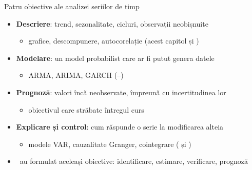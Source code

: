 \begin{frame}{Patru obiective ale analizei seriilor de timp}
\itemsize{\small}
\begin{itemize}
    \item \textbf{Descriere}: trend, sezonalitate, cicluri, observații neobișnuite
    \begin{itemize}
        \item grafice, descompunere, autocorelație (acest capitol și )
    \end{itemize}
    \item \textbf{Modelare}: un model probabilist care ar fi putut genera datele
    \begin{itemize}
        \item ARMA, ARIMA, GARCH (--)
    \end{itemize}
    \item \textbf{Prognoză}: valori încă neobservate, împreună cu incertitudinea lor
    \begin{itemize}
        \item obiectivul care străbate întregul curs
    \end{itemize}
    \item \textbf{Explicare și control}: cum răspunde o serie la modificarea alteia
    \begin{itemize}
        \item modele VAR, cauzalitate Granger, cointegrare ( și )
    \end{itemize}
    \item {}\ au formulat aceleași obiective: identificare, estimare, verificare, prognoză
\end{itemize}
\end{frame}

